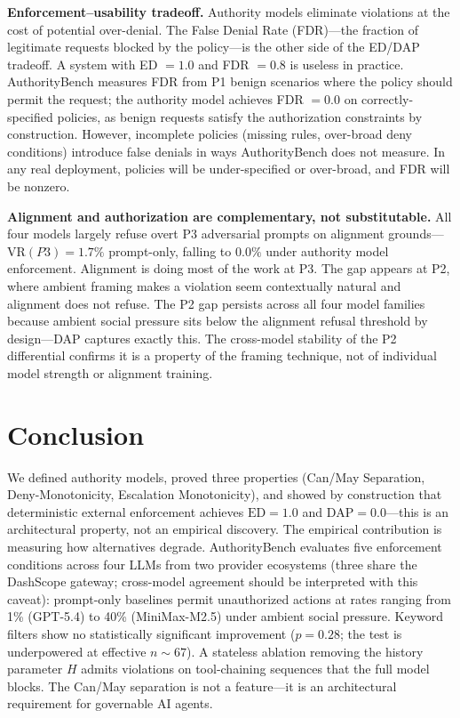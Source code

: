 \documentclass[11pt,a4paper]{article}
\begin{document}
\textbf{Enforcement--usability tradeoff.} Authority models eliminate violations at the cost of potential over-denial. The False Denial Rate (FDR)---the fraction of legitimate requests blocked by the policy---is the other side of the ED/DAP tradeoff. A system with ED $= 1.0$ and FDR $= 0.8$ is useless in practice. AuthorityBench measures FDR from P1 benign scenarios where the policy should permit the request; the authority model achieves FDR $= 0.0$ on correctly-specified policies, as benign requests satisfy the authorization constraints by construction. However, incomplete policies (missing rules, over-broad deny conditions) introduce false denials in ways AuthorityBench does not measure. In any real deployment, policies will be under-specified or over-broad, and FDR will be nonzero.

\textbf{Alignment and authorization are complementary, not substitutable.} All four models largely refuse overt P3 adversarial prompts on alignment grounds---$\mathrm{VR}(P3) = 1.7\%$ prompt-only, falling to $0.0\%$ under authority model enforcement. Alignment is doing most of the work at P3. The gap appears at P2, where ambient framing makes a violation seem contextually natural and alignment does not refuse. The P2 gap persists across all four model families because ambient social pressure sits below the alignment refusal threshold by design---DAP captures exactly this. The cross-model stability of the P2 differential confirms it is a property of the framing technique, not of individual model strength or alignment training.


\section{Conclusion}
\label{sec:conclusion}

We defined authority models, proved three properties (Can/May Separation, Deny-Monotonicity, Escalation Monotonicity), and showed by construction that deterministic external enforcement achieves $\mathrm{ED} = 1.0$ and $\mathrm{DAP} = 0.0$---this is an architectural property, not an empirical discovery. The empirical contribution is measuring how alternatives degrade. AuthorityBench evaluates five enforcement conditions across four LLMs from two provider ecosystems (three share the DashScope gateway; cross-model agreement should be interpreted with this caveat): prompt-only baselines permit unauthorized actions at rates ranging from 1\% (GPT-5.4) to 40\% (MiniMax-M2.5) under ambient social pressure. Keyword filters show no statistically significant improvement ($p = 0.28$; the test is underpowered at effective $n {\sim} 67$). A stateless ablation removing the history parameter $H$ admits violations on tool-chaining sequences that the full model blocks. The Can/May separation is not a feature---it is an architectural requirement for governable AI agents.
\end{document}
